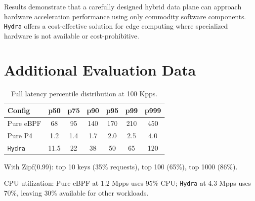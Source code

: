 \documentclass[sigconf,anonymous,10pt]{acmart}
\newcommand{\hydra}{\texttt{Hydra}}
\begin{document}
Results demonstrate that a carefully designed hybrid data plane can approach hardware acceleration performance using only commodity software components. \hydra{} offers a cost-effective solution for edge computing where specialized hardware is not available or cost-prohibitive.




\appendix
\section{Additional Evaluation Data}
\label{appendix:extra}

\begin{table}[h]
    \centering
    \caption{Full latency percentile distribution at 100 Kpps.}
    \label{tab:latency-full}
    \begin{tabular}{lcccccc}
        \toprule
        Config & p50 & p75 & p90 & p95 & p99 & p999 \\
        \midrule
        Pure eBPF & 68 & 95 & 140 & 170 & 210 & 450 \\
        Pure P4 & 1.2 & 1.4 & 1.7 & 2.0 & 2.5 & 4.0 \\
        \hydra{} & 11.5 & 22 & 38 & 50 & 65 & 120 \\
        \bottomrule
    \end{tabular}
\end{table}

With Zipf(0.99): top 10 keys (35\% requests), top 100 (65\%), top 1000 (86\%).

CPU utilization: Pure eBPF at 1.2 Mpps uses 95\% CPU; \hydra{} at 4.3 Mpps uses 70\%, leaving 30\% available for other workloads.
\end{document}
